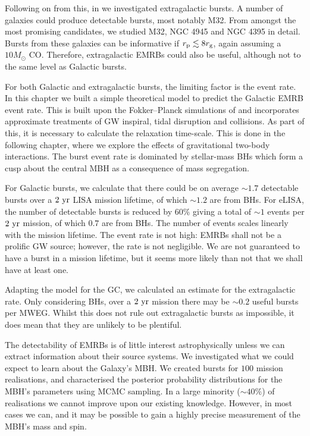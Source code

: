 Following on from this, in  we investigated extragalactic bursts. A number of galaxies could produce detectable bursts, most notably M32. From amongst the most promising candidates, we studied M32, NGC 4945 and NGC 4395 in detail. Bursts from these galaxies can be informative if $r_\mathrm{p} \lesssim 8 r_\mathrm{g}$, again assuming a $10 M_\odot$ CO. Therefore, extragalactic EMRBs could also be useful, although not to the same level as Galactic bursts.

For both Galactic and extragalactic bursts, the limiting factor is the event rate. In this chapter we built a simple theoretical model to predict the Galactic EMRB event rate. This is built upon the Fokker--Planck simulations of \citet{Alexander2009} and incorporates approximate treatments of GW inspiral, tidal disruption and collisions. As part of this, it is necessary to calculate the relaxation time-scale. This is done in the following chapter, where we explore the effects of gravitational two-body interactions. The burst event rate is dominated by stellar-mass BHs which form a cusp about the central MBH as a consequence of mass segregation.

For Galactic bursts, we calculate that there could be on average $\sim1.7$ detectable bursts over a $2~\mathrm{yr}$ LISA mission lifetime, of which $\sim1.2$ are from BHs. For eLISA, the number of detectable bursts is reduced by $60\%$ giving a total of $\sim1$ events per $2~\mathrm{yr}$ mission, of which $0.7$ are from BHs. The number of events scales linearly with the mission lifetime. The event rate is not high: EMRBs shall not be a prolific GW source; however, the rate is not negligible. We are not guaranteed to have a burst in a mission lifetime, but it seems more likely than not that we shall have at least one.

Adapting the model for the GC, we calculated an estimate for the extragalactic rate. Only considering BHs, over a $2~\mathrm{yr}$ mission there may be $\sim0.2$ useful bursts per MWEG. Whilst this does not rule out extragalactic bursts as impossible, it does mean that they are unlikely to be plentiful.

The detectability of EMRBs is of little interest astrophysically unless we can extract information about their source systems. We investigated what we could expect to learn about the Galaxy's MBH. We created bursts for $100$ mission realisations, and characterised the posterior probability distributions for the MBH's parameters using MCMC sampling. In a large minority ($\sim40\%$) of realisations we cannot improve upon our existing knowledge. However, in most cases we can, and it may be possible to gain a highly precise measurement of the MBH's mass and spin.

